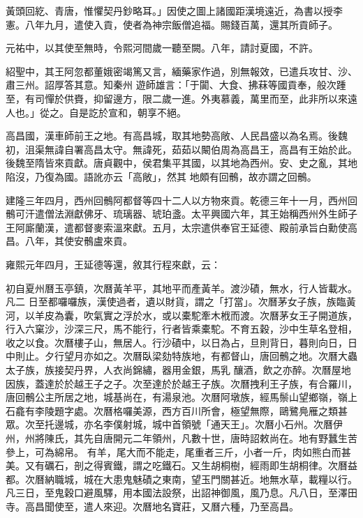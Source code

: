 \begin{pinyinscope}
 黃頭回紇、青唐，惟懼契丹鈔略耳。」因使之圖上諸國距漢境遠近，為書以授李憲。八年九月，遣使入貢，使者為神宗飯僧追福。賜錢百萬，還其所貢師子。



 元祐中，以其使至無時，令熙河間歲一聽至闕。八年，請討夏國，不許。



 紹聖中，其王阿忽都董娥密竭篤又言，緬藥家作過，別無報效，已遣兵攻甘、沙、肅三州。詔厚答其意。知秦州
 遊師雄言：「于闐、大食、拂菻等國貢奉，般次踵至，有司憚於供賚，抑留邊方，限二歲一進。外夷慕義，萬里而至，此非所以來遠人也。」從之。自是訖於宣和，朝享不絕。



 高昌國，漢車師前王之地。有高昌城，取其地勢高敞、人民昌盛以為名焉。後魏初，沮渠無諱自署高昌太守。無諱死，茹茹以闞伯周為高昌王，高昌有王始於此。後魏至隋皆來貢獻。唐貞觀中，侯君集平其國，以其地為西州。安、史之亂，其地陷沒，乃復為國。語訛亦云「高敞」，然其
 地頗有回鶻，故亦謂之回鶻。



 建隆三年四月，西州回鶻阿都督等四十二人以方物來貢。乾德三年十一月，西州回鶻可汗遣僧法淵獻佛牙、琉璃器、琥珀盞。太平興國六年，其王始稱西州外生師子王阿廝蘭漢，遣都督麥索溫來獻。五月，太宗遣供奉官王延德、殿前承旨白勳使高昌。八年，其使安鶻盧來貢。



 雍熙元年四月，王延德等還，敘其行程來獻，云：



 初自夏州曆玉亭鎮，次曆黃羊平，其地平而產黃羊。渡沙磧，無水，行人皆載水。凡二
 日至都囉囉族，漢使過者，遺以財貨，謂之「打當」。次曆茅女子族，族臨黃河，以羊皮為囊，吹氣實之浮於水，或以橐駝牽木栰而渡。次曆茅女王子開道族，行入六窠沙，沙深三尺，馬不能行，行者皆乘橐駝。不育五穀，沙中生草名登相，收之以食。次曆樓子山，無居人。行沙磧中，以日為占，旦則背日，暮則向日，日中則止。夕行望月亦如之。次曆臥梁劾特族地，有都督山，唐回鶻之地。次曆大蟲太子族，族接契丹界，人衣尚錦繡，器用金銀，馬乳
 釀酒，飲之亦醉。次曆屋地因族，蓋達於於越王子之子。次至達於於越王子族。次曆拽利王子族，有合羅川，唐回鶻公主所居之地，城基尚在，有湯泉池。次曆阿墩族，經馬鬃山望鄉嶺，嶺上石龕有李陵題字處。次曆格囉美源，西方百川所會，極望無際，鷗鷺鳧雁之類甚眾。次至托邊城，亦名李僕射城，城中首領號「通天王」。次曆小石州。次曆伊州，州將陳氏，其先自唐開元二年領州，凡數十世，唐時詔敕尚在。地有野蠶生苦參上，可為綿帛。
 有羊，尾大而不能走，尾重者三斤，小者一斤，肉如熊白而甚美。又有礪石，剖之得賓鐵，謂之吃鐵石。又生胡桐樹，經雨即生胡桐律。次曆益都。次曆納職城，城在大患鬼魅磧之東南，望玉門關甚近。地無水草，載糧以行。凡三日，至鬼穀口避風驛，用本國法設祭，出詔神御風，風乃息。凡八日，至澤田寺。高昌聞使至，遣人來迎。次曆地名寶莊，又曆六種，乃至高昌。




\end{pinyinscope}
